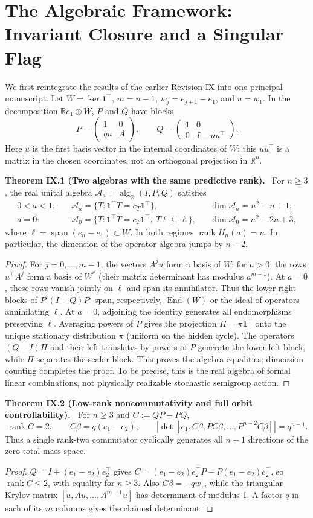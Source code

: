 \documentclass[11pt,a4paper,oneside]{book}
\newcommand{\R}{\mathbb R}\newcommand{\C}{\mathbb C}\newcommand{\Z}{\mathbb Z}\newcommand{\N}{\mathbb N}\newcommand{\Q}{\mathbb Q}
\newcommand{\one}{\mathbf 1}\newcommand{\ii}{\mathrm i}\newcommand{\dd}{\mathrm d}
\DeclareMathOperator{\rank}{rank}\DeclareMathOperator{\Tr}{Tr}
\newcommand{\statement}[3]{\par\medskip\noindent\textbf{#1 #2 (#3).}\ }
\begin{document}
\chapter{The Algebraic Framework: Invariant Closure and a Singular Flag}
We first reintegrate the results of the earlier Revision IX into one principal manuscript. Let $W=\ker\one^\top$, $m=n-1$, $w_j=e_{j+1}-e_1$, and $u=w_1$. In the decomposition $\R e_1\oplus W$, $P$ and $Q$ have blocks
\[P=\begin{pmatrix}1&0\\qu&A\end{pmatrix},\qquad Q=\begin{pmatrix}1&0\\0&I-uu^\top\end{pmatrix}.\]
Here $u$ is the first basis vector in the internal coordinates of $W$; this $uu^\top$ is a matrix in the chosen coordinates, not an orthogonal projection in $\R^n$.
\statement{Theorem}{IX.1}{Two algebras with the same predictive rank} For $n\ge3$, the real unital algebra $\mathcal A_a=\operatorname{alg}_{\R}(I,P,Q)$ satisfies
\begin{align*}0<a<1:\quad&\mathcal A_a=\{T:\one^\top T=c_T\one^\top\},&&\dim\mathcal A_a=n^2-n+1;\\
a=0:\quad&\mathcal A_0=\{T:\one^\top T=c_T\one^\top,\ T\ell\subseteq\ell\},&&\dim\mathcal A_0=n^2-2n+3,
\end{align*}
where $\ell=\operatorname{span}(e_n-e_1)\subset W$. In both regimes $\rank H_n(a)=n$. In particular, the dimension of the operator algebra jumps by $n-2$.
\begin{proof}For $j=0,\ldots,m-1$, the vectors $A^ju$ form a basis of $W$; for $a>0$, the rows $u^\top A^j$ form a basis of $W^*$ (their matrix determinant has modulus $a^{m-1}$). At $a=0$, these rows vanish jointly on $\ell$ and span its annihilator. Thus the lower-right blocks of $P^i(I-Q)P^j$ span, respectively, $\operatorname{End}(W)$ or the ideal of operators annihilating $\ell$. At $a=0$, adjoining the identity generates all endomorphisms preserving $\ell$. Averaging powers of $P$ gives the projection $\Pi=\pi\one^\top$ onto the unique stationary distribution $\pi$ (uniform on the hidden cycle). The operators $(Q-I)\Pi$ and their left translates by powers of $P$ generate the lower-left block, while $\Pi$ separates the scalar block. This proves the algebra equalities; dimension counting completes the proof. To be precise, this is the real algebra of formal linear combinations, not physically realizable stochastic semigroup action.\end{proof}
\statement{Theorem}{IX.2}{Low-rank noncommutativity and full orbit controllability} For $n\ge3$ and $C:=QP-PQ$,
\[\rank C=2,\qquad C\beta=q(e_1-e_2),\qquad\left|\det[e_1,C\beta,PC\beta,\ldots,P^{n-2}C\beta]\right|=q^{n-1}.\]
Thus a single rank-two commutator cyclically generates all $n-1$ directions of the zero-total-mass space.
\begin{proof}$Q=I+(e_1-e_2)e_2^\top$ gives $C=(e_1-e_2)e_2^\top P-P(e_1-e_2)e_2^\top$, so $\rank C\le2$, with equality for $n\ge3$. Also $C\beta=-qw_1$, while the triangular Krylov matrix $[u,Au,\ldots,A^{m-1}u]$ has determinant of modulus 1. A factor $q$ in each of its $m$ columns gives the claimed determinant.\end{proof}
\end{document}
